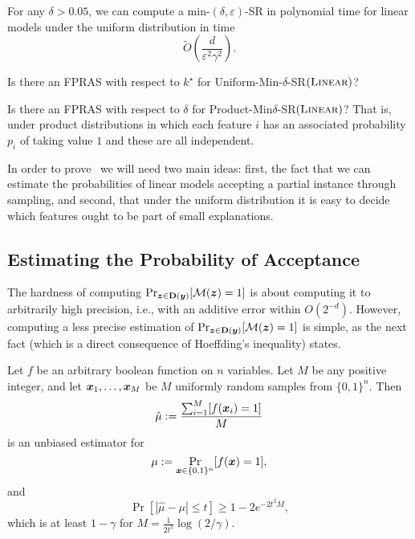 \begin{theorem}\label{thm:delta-large}
    For any $\delta > 0.05$, we can compute a min-$(\delta, \varepsilon)$-SR in polynomial time for linear models under the uniform distribution in time
    \[ 
        \tilde{O}\left(\frac{d}{\varepsilon^2\gamma^2}\right).
    \]
\end{theorem}

\begin{open}
    Is there an FPRAS with respect to $k^\star$ for  Uniform-Min-$\delta$-SR$(\textsc{Linear})$?
\end{open}

\begin{open}
    Is there an FPRAS with respect to $\delta$ for Product-Min$\delta$-SR$(\textsc{Linear})$? That is, under product distributions in which each feature $i$ has an associated probability $p_i$ of taking value $1$ and these are all independent.
\end{open}


In order to prove~ we will need two main ideas: first, the fact that we can estimate the probabilities of linear models accepting a partial instance through sampling, and second, that under the uniform distribution it is easy to decide which features ought to be part of small explanations.

\subsection{Estimating the Probability of Acceptance}
 The  hardness of computing
$\Pr_{{\bm{z}}  \in \mathbf{D}({\bm{y}})}[\mathcal{M}({\bm{z}}) = 1]$ is about computing it to arbitrarily high precision, i.e., with an additive error within $O(2^{-d})$. However, computing a less precise estimation of $\Pr_{{\bm{z}} \in \mathbf{D}({\bm{y}})}[\mathcal{M}({\bm{z}}) = 1]$ is simple, as the next fact (which is a direct consequence of Hoeffding's inequality)  states.

\begin{fact}\label{fact:hoeffding}
    Let $f$ be an arbitrary boolean function on $n$ variables. Let $M$ be any positive integer,
    and let ${\bm{x}}_1, \ldots, {\bm{x}}_M$ be $M$ uniformly random samples from $\{0, 1\}^n$. Then 
    \[
        \hat{\mu} := \frac{\sum_{i=1}^M [f({\bm{x}}_i) = 1]}{M}
    \]
    is an unbiased estimator for 
    \[
        \mu := \Pr_{{\bm{x}} \in \{0, 1\}^n}[f({\bm{x}}) = 1],
    \]
    and 
    \[
    \Pr[\left|\hat{\mu} - \mu \right| \leq t] \geq 1 - 2e^{-2t^2 M},
    \]
    which is at least $1 - \gamma$ for $M = \frac{1}{2t^2} \log(2/\gamma)$.
\end{fact}


